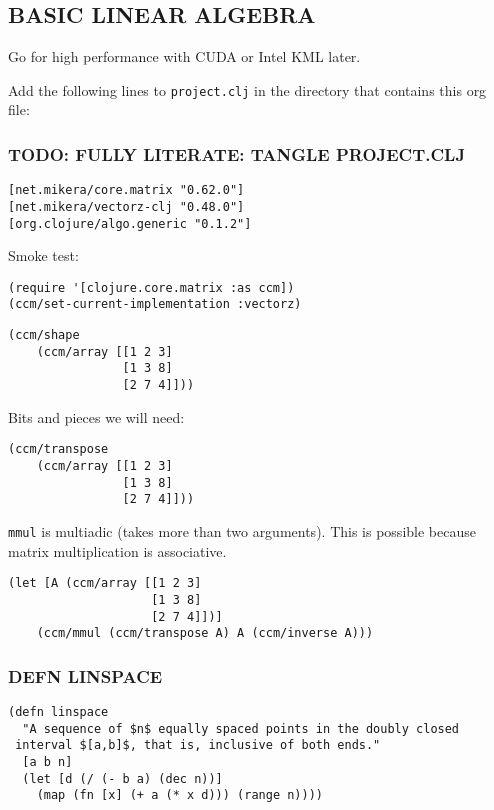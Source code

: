 \documentclass[10pt,oneside,x11names]{article}
\begin{document}
\subsection{BASIC LINEAR ALGEBRA}
\label{basic-linear-algebra}
Go for high performance with CUDA or Intel KML later.

Add the following lines to \texttt{project.clj} in the directory that contains this
org file:

\subsubsection{TODO: FULLY LITERATE: TANGLE PROJECT.CLJ}
\label{sec:org695e119}

\begin{verbatim}
[net.mikera/core.matrix "0.62.0"]
[net.mikera/vectorz-clj "0.48.0"]
[org.clojure/algo.generic "0.1.2"]
\end{verbatim}

Smoke test:

\begin{verbatim}
(require '[clojure.core.matrix :as ccm])
(ccm/set-current-implementation :vectorz)
\end{verbatim}

\begin{verbatim}
(ccm/shape
    (ccm/array [[1 2 3]
                [1 3 8]
                [2 7 4]]))
\end{verbatim}

Bits and pieces we will need:

\begin{verbatim}
(ccm/transpose
    (ccm/array [[1 2 3]
                [1 3 8]
                [2 7 4]]))
\end{verbatim}

\texttt{mmul} is multiadic (takes more than two arguments). This is possible
because matrix multiplication is associative.

\begin{verbatim}
(let [A (ccm/array [[1 2 3]
                    [1 3 8]
                    [2 7 4]])]
    (ccm/mmul (ccm/transpose A) A (ccm/inverse A)))
\end{verbatim}

\subsubsection{DEFN LINSPACE}
\label{linspace}
\begin{verbatim}
(defn linspace
  "A sequence of $n$ equally spaced points in the doubly closed
 interval $[a,b]$, that is, inclusive of both ends."
  [a b n]
  (let [d (/ (- b a) (dec n))]
    (map (fn [x] (+ a (* x d))) (range n))))
\end{verbatim}
\end{document}
